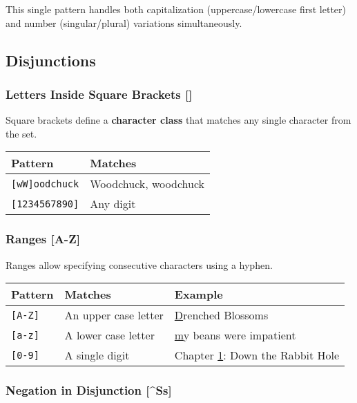 \documentclass[11pt,a4paper]{article}
\theoremstyle{definition}
\theoremstyle{plain}
\theoremstyle{remark}
\begin{document}
This single pattern handles both capitalization (uppercase/lowercase first letter) and number (singular/plural) variations simultaneously.

\subsection{Disjunctions}

\subsubsection{Letters Inside Square Brackets []}

Square brackets define a \textbf{character class} that matches any single character from the set.

\begin{table}[h]
\centering
\begin{tabular}{|l|l|}
\hline
\textbf{Pattern} & \textbf{Matches} \\
\hline
\texttt{[wW]oodchuck} & Woodchuck, woodchuck \\
\hline
\texttt{[1234567890]} & Any digit \\
\hline
\end{tabular}
\end{table}

\subsubsection{Ranges [A-Z]}

Ranges allow specifying consecutive characters using a hyphen.

\begin{table}[h]
\centering
\begin{tabular}{|l|l|l|}
\hline
\textbf{Pattern} & \textbf{Matches} & \textbf{Example} \\
\hline
\texttt{[A-Z]} & An upper case letter & \underline{D}renched Blossoms \\
\hline
\texttt{[a-z]} & A lower case letter & \underline{m}y beans were impatient \\
\hline
\texttt{[0-9]} & A single digit & Chapter \underline{1}: Down the Rabbit Hole \\
\hline
\end{tabular}
\end{table}

\subsubsection{Negation in Disjunction [\^{}Ss]}
\end{document}

